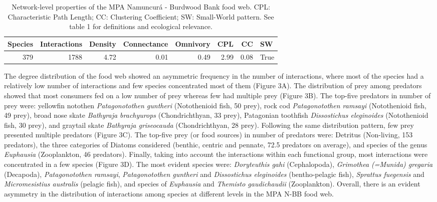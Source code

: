 \documentclass[preprint, 3p,
authoryear]{elsarticle} %
\begin{document}
\begin{table}

\caption{\label{tab:table2}Network-level properties of the MPA Namuncurá - Burdwood Bank food web. CPL: Characteristic Path Length; CC: Clustering Coefficient; SW: Small-World pattern. See table 1 for definitions and ecological relevance.}
\centering
\begin{tabular}[t]{r|r|r|r|r|r|r|l}
\hline
\textbf{Species} & \textbf{Interactions} & \textbf{Density} & \textbf{Connectance} & \textbf{Omnivory} & \textbf{CPL} & \textbf{CC} & \textbf{SW}\\
\hline
379 & 1788 & 4.72 & 0.01 & 0.49 & 2.99 & 0.08 & True\\
\hline
\end{tabular}
\end{table}

The degree distribution of the food web showed an asymmetric frequency
in the number of interactions, where most of the species had a
relatively low number of interactions and few species concentrated most
of them (Figure 3A). The distribution of prey among predators showed
that most consumers fed on a low number of prey whereas few had multiple
prey (Figure 3B). The top-five predators in number of prey were:
yellowfin notothen \emph{Patagonotothen guntheri} (Notothenioid fish, 50
prey), rock cod \emph{Patagonotothen ramsayi} (Notothenioid fish, 49
prey), broad nose skate \emph{Bathyraja brachyurops} (Chondrichthyan, 33
prey), Patagonian toothfish \emph{Dissostichus eleginoides}
(Notothenioid fish, 30 prey), and graytail skate \emph{Bathyraja
griseocauda} (Chondrichthyan, 28 prey). Following the same distribution
pattern, few prey presented multiple predators (Figure 3C). The top-five
prey (or food sources) in number of predators were: Detritus
(Non-living, 153 predators), the three categories of Diatoms considered
(benthic, centric and pennate, 72.5 predators on average), and species
of the genus \emph{Euphausia} (Zooplankton, 46 predators). Finally,
taking into account the interactions within each functional group, most
interactions were concentrated in a few species (Figure 3D). The most
evident species were: \emph{Doryteuthis gahi} (Cephalopoda),
\emph{Grimothea (=Munida) gregaria} (Decapoda), \emph{Patagonotothen
ramsayi}, \emph{Patagonotothen guntheri} and \emph{Dissostichus
eleginoides} (bentho-pelagic fish), \emph{Sprattus fuegensis} and
\emph{Micromesistius australis} (pelagic fish), and species of
\emph{Euphausia} and \emph{Themisto gaudichaudii} (Zooplankton).
Overall, there is an evident asymmetry in the distribution of
interactions among species at different levels in the MPA N-BB food web.
\end{document}
